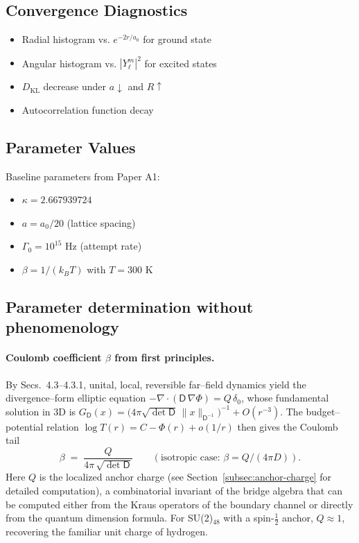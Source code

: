 \documentclass[11pt]{article}
\theoremstyle{plain}
\theoremstyle{definition}
\begin{document}
\subsection{Convergence Diagnostics}

\begin{itemize}
  \item Radial histogram vs. $e^{-2r/a_0}$ for ground state
  \item Angular histogram vs. $|Y_\ell^m|^2$ for excited states
  \item $D_{\mathrm{KL}}$ decrease under $a\downarrow$ and $R\uparrow$
  \item Autocorrelation function decay
\end{itemize}

\subsection{Parameter Values}

Baseline parameters from Paper A1:
\begin{itemize}
  \item $\kappa = 2.667939724$
  \item $a = a_0/20$ (lattice spacing)
  \item $\Gamma_0 = 10^{15}$ Hz (attempt rate)
  \item $\beta = 1/(k_B T)$ with $T = 300$ K
\end{itemize}

\subsection{Parameter determination without phenomenology}\label{sec:param-determination}

\paragraph{Coulomb coefficient $\beta$ from first principles.}
By Secs.~4.3–4.3.1, unital, local, reversible far–field dynamics yield the divergence–form elliptic equation
$-\nabla\!\cdot\!(\mathsf{D}\,\nabla \Phi)=Q\,\delta_0$,
whose fundamental solution in 3D is
$G_{\mathsf{D}}(x)=\big(4\pi\sqrt{\det\mathsf{D}}\,\|x\|_{\mathsf{D}^{-1}}\big)^{-1}+O(r^{-3})$.
The budget–potential relation $\log T(r)=C-\Phi(r)+o(1/r)$ then gives the Coulomb tail
\begin{equation}\label{eq:beta-from-DQ}
  \beta \;=\; \frac{Q}{4\pi\,\sqrt{\det \mathsf{D}}}\qquad
  (\text{isotropic case: }\beta=Q/(4\pi D)).
\end{equation}
Here $Q$ is the localized anchor charge (see Section~\ref{subsec:anchor-charge} for detailed computation),
a combinatorial invariant of the bridge algebra that can be computed either from the Kraus operators
of the boundary channel or directly from the quantum dimension formula. For SU(2)$_{48}$ with a
spin-$\frac{1}{2}$ anchor, $Q \approx 1$, recovering the familiar unit charge of hydrogen.
\end{document}
